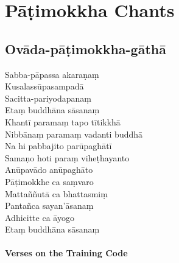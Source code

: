 \chapter{Pāṭimokkha Chants}

\section{Ovāda-pāṭimokkha-gāthā}

\begin{leader}
\end{leader}


\begin{paritta}
Sabba-pāpassa akaraṇaṃ\\
Kusalassūpasampadā\\
Sacitta-pariyodapanaṃ\\
Etaṃ buddhāna sāsanaṃ\\
Khantī paramaṃ tapo tītikkhā\\
Nibbānaṃ paramaṃ vadanti buddhā\\
Na hi pabbajito parūpaghātī\\
Samaṇo hoti paraṃ viheṭhayanto\\
Anūpavādo anūpaghāto\\
Pāṭimokkhe ca saṃvaro\\
Mattaññutā ca bhattasmiṃ\\
Pantañca sayan'āsanaṃ\\
Adhicitte ca āyogo\\
Etaṃ buddhāna sāsanaṃ
\end{paritta}


\subsubsection{Verses on the Training Code}

\bigskip

